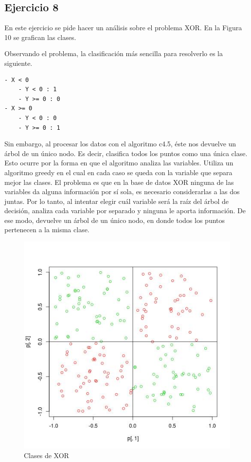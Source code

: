 \documentclass[12pt, a4paper]{article}
\begin{document}
\subsection*{Ejercicio 8}
En este ejercicio se pide hacer un análisis sobre el problema XOR. En la Figura 10 se grafican las clases.

\bigskip

Observando el problema, la clasificación más sencilla para resolverlo es la siguiente. 
\begin{verbatim}
- X < 0
    - Y < 0 : 1
    - Y >= 0 : 0
- X >= 0
    - Y < 0 : 0
    - Y >= 0 : 1
\end{verbatim}

Sin embargo, al procesar los datos con el algoritmo c4.5, éste nos devuelve un árbol de un único nodo. Es decir, clasifica todos los puntos como una única clase. \\
Esto ocurre por la forma en que el algoritmo analiza las variables. Utiliza un algoritmo greedy en el cual en cada caso se queda con la variable que separa mejor las clases. El problema es que en la base de datos XOR ninguna de las variables da alguna información por sí sola, es necesario considerarlas a las dos juntas. Por lo tanto, al intentar elegir cuál variable será la raíz del árbol de decisión, analiza cada variable por separado y ninguna le aporta información. De ese modo, devuelve un árbol de un único nodo, en donde todos los puntos pertenecen a la misma clase. 

\begin{figure}
    \centering
	\includegraphics[scale=0.50]{ejercicio8}
	\caption{Clases de XOR}
\end{figure}
\end{document}
